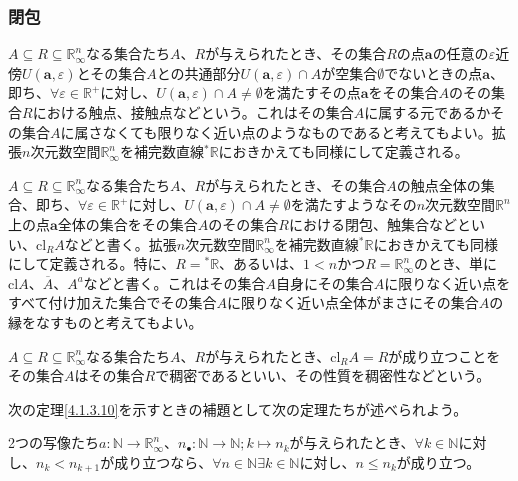 \documentclass[dvipdfmx]{jsarticle}
\begin{document}
\subsubsection{閉包}%
\begin{dfn}
$A \subseteq R \subseteq \mathbb{R}_{\infty}^{n}$なる集合たち$A$、$R$が与えられたとき、その集合$R$の点$\mathbf{a}$の任意の$\varepsilon$近傍$U\left( \mathbf{a},\varepsilon \right)$とその集合$A$との共通部分$U\left( \mathbf{a},\varepsilon \right) \cap A$が空集合$\emptyset$でないときの点$\mathbf{a}$、即ち、$\forall\varepsilon \in \mathbb{R}^{+}$に対し、$U\left( \mathbf{a},\varepsilon \right) \cap A \neq \emptyset$を満たすその点$\mathbf{a}$をその集合$A$のその集合$R$における触点、接触点などという。これはその集合$A$に属する元であるかその集合$A$に属さなくても限りなく近い点のようなものであると考えてもよい。拡張$n$次元数空間$\mathbb{R}_{\infty}^{n}$を補完数直線${}^{*}\mathbb{R}$におきかえても同様にして定義される。
\end{dfn}
\begin{dfn}
$A \subseteq R \subseteq \mathbb{R}_{\infty}^{n}$なる集合たち$A$、$R$が与えられたとき、その集合$A$の触点全体の集合、即ち、$\forall\varepsilon \in \mathbb{R}^{\mathbf{+}}$に対し、$U\left( \mathbf{a},\varepsilon \right) \cap A \neq \emptyset$を満たすようなその$n$次元数空間$\mathbb{R}^{n}$上の点$\mathbf{a}$全体の集合をその集合$A$のその集合$R$における閉包、触集合などといい、$\mathrm{cl}_{R}A$などと書く。拡張$n$次元数空間$\mathbb{R}_{\infty}^{n}$を補完数直線${}^{*}\mathbb{R}$におきかえても同様にして定義される。特に、$R ={}^{*}\mathbb{R}$、あるいは、$1 < n$かつ$R = \mathbb{R}_{\infty}^{n}$のとき、単に$\mathrm{cl}A$、$\overline{A}$、$A^{a}$などと書く。これはその集合$A$自身にその集合$A$に限りなく近い点をすべて付け加えた集合でその集合$A$に限りなく近い点全体がまさにその集合$A$の縁をなすものと考えてもよい。
\end{dfn}
\begin{dfn}
$A \subseteq R \subseteq \mathbb{R}_{\infty}^{n}$なる集合たち$A$、$R$が与えられたとき、$\mathrm{cl}_{R}A = R$が成り立つことをその集合$A$はその集合$R$で稠密であるといい、その性質を稠密性などという。
\end{dfn}\par
次の定理\ref{4.1.3.10}を示すときの補題として次の定理たちが述べられよう。
\begin{thm}\label{4.1.3.9}
2つの写像たち$a:\mathbb{N} \rightarrow \mathbb{R}_{\infty}^{n}$、$n_{\bullet}:\mathbb{N} \rightarrow \mathbb{N};k \mapsto n_{k}$が与えられたとき、$\forall k \in \mathbb{N}$に対し、$n_{k} < n_{k + 1}$が成り立つなら、$\forall n \in \mathbb{N}\exists k \in \mathbb{N}$に対し、$n \leq n_{k}$が成り立つ。
\end{thm}
\end{document}

